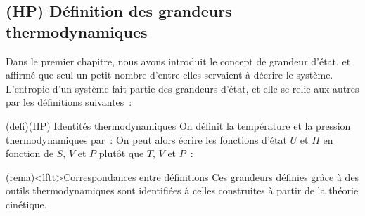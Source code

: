 \documentclass[../../main/main.tex]{subfiles}
\begin{document}
\subsection{(HP) Définition des grandeurs thermodynamiques}
Dans le premier chapitre, nous avons introduit le concept de grandeur d'état, et
affirmé que seul un petit nombre d'entre elles servaient à décrire le système.
L'entropie d'un système fait partie des grandeurs d'état, et elle se relie aux
autres par les définitions suivantes~:
\begin{tcb}(defi){(HP) Identités thermodynamiques}
	On définit la température et la pression thermodynamiques par~:
	\psw{%
		\[
			T = \eval{\pdv{U}{S}}_{V}
			\qet
			P = -\eval{\pdv{U}{V}}_{S}
		\]
	}%
	On peut alors écrire les fonctions d'état $U$ et $H$ en fonction de $S$, $V$
	et $P$ plutôt que $T$, $V$ et $P$~:
	\smallbreak
	\begin{isd}[sidebyside align=top]
		\vspace{-15pt}
		\tcblower
		\vspace{-15pt}
	\end{isd}
\end{tcb}

\begin{tcb}(rema)<lftt>{Correspondances entre définitions}
	Ces grandeurs définies grâce à des outils thermodynamiques sont identifiées à
	celles construites à partir de la théorie cinétique.
\end{tcb}
\end{document}
